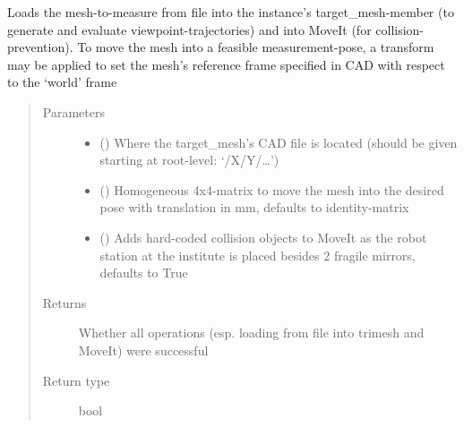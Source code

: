 \documentclass[letterpaper,10pt,english]{sphinxmanual}
\begin{document}
\begin{fulllineitems}
\begin{fulllineitems}
\label{\detokenize{module_trajectory_manager:agiprobot_measurement.trajectory_manager.TrajectoryManager.load_target_mesh}}
Loads the mesh-to-measure from file into the instance’s target\_mesh-member (to generate and evaluate viewpoint-trajectories) and into
MoveIt (for collision-prevention). To move the mesh into a feasible measurement-pose, a transform may be applied to set the mesh’s
reference frame specified in CAD with respect to the ‘world’ frame
\begin{quote}\begin{description}
\item[{Parameters}] \leavevmode\begin{itemize}
\item {} 
 () \textendash{} Where the target\_mesh’s CAD file is located (should be given starting at root-level: ‘/X/Y/…’)

\item {} 
 (\sphinxstyleliteralemphasis{, }) \textendash{} Homogeneous 4x4-matrix to move the mesh into the desired pose with translation in mm, defaults to identity-matrix

\item {} 
 (\sphinxstyleliteralemphasis{, }) \textendash{} Adds hard-coded collision objects to MoveIt as the robot station at the institute is placed besides 2 fragile mirrors, defaults to True

\end{itemize}

\item[{Returns}] \leavevmode
Whether all operations (esp. loading from file into trimesh and MoveIt) were successful

\item[{Return type}] \leavevmode
bool

\end{description}\end{quote}


\end{fulllineitems}
\end{fulllineitems}
\end{document}
